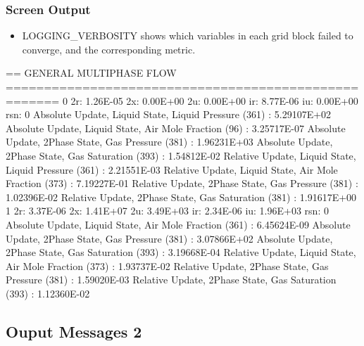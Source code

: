 \documentclass{beamer}
\newcommand\redcomment[1]{{{\color{red} #1}}}
\begin{document}
\begin{frame}[fragile]\frametitle{Screen Output}

\begin{itemize}
\item \redcomment{LOGGING\_VERBOSITY} shows which variables in each grid block failed to converge, and the corresponding metric.
\end{itemize}

\begin{semiverbatim}
\tiny
== GENERAL MULTIPHASE FLOW =====================================================
  0 2r: 1.26E-05 2x: 0.00E+00 2u: 0.00E+00 ir: 8.77E-06 iu: 0.00E+00 rsn:   0
   Absolute Update, Liquid State, Liquid Pressure (361) : 5.29107E+02
   Absolute Update, Liquid State, Air Mole Fraction (96) : 3.25717E-07
   Absolute Update, 2Phase State, Gas Pressure (381) : 1.96231E+03
   Absolute Update, 2Phase State, Gas Saturation (393) : 1.54812E-02
   Relative Update, Liquid State, Liquid Pressure (361) : 2.21551E-03
   Relative Update, Liquid State, Air Mole Fraction (373) : 7.19227E-01
   Relative Update, 2Phase State, Gas Pressure (381) : 1.02396E-02
   Relative Update, 2Phase State, Gas Saturation (381) : 1.91617E+00
  1 2r: 3.37E-06 2x: 1.41E+07 2u: 3.49E+03 ir: 2.34E-06 iu: 1.96E+03 rsn:   0
   Absolute Update, Liquid State, Air Mole Fraction (361) : 6.45624E-09
   Absolute Update, 2Phase State, Gas Pressure (381) : 3.07866E+02
   Absolute Update, 2Phase State, Gas Saturation (393) : 3.19668E-04
   Relative Update, Liquid State, Air Mole Fraction (373) : 1.93737E-02
   Relative Update, 2Phase State, Gas Pressure (381) : 1.59020E-03
   Relative Update, 2Phase State, Gas Saturation (393) : 1.12360E-02

\end{semiverbatim}
\end{frame}

\subsection{Ouput Messages 2}
\end{document}

